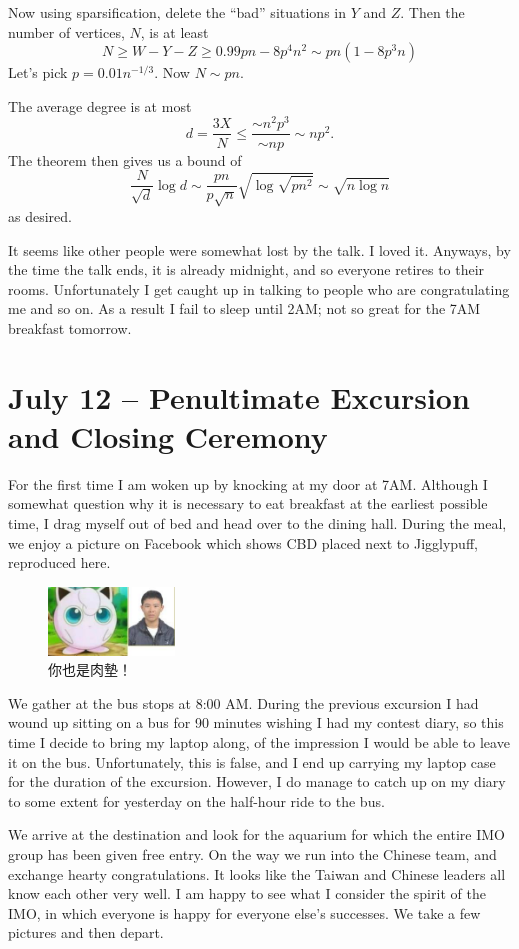 \documentclass[11pt]{scrreprt}
\numberwithin{figure}{chapter}
\begin{document}
Now using sparsification, delete the ``bad'' situations in $Y$ and $Z$.  Then the number of vertices, $N$, is at least
\[ N \ge W - Y - Z \ge 0.99 pn - 8p^4n^2 \sim pn(1-8p^3n) \]
Let's pick $p = 0.01n^{-1/3}$.  Now $N \sim pn$.

The average degree is at most \[ d = \frac{3X}{N} \le \frac{\sim n^2p^3}{\sim np} \sim np^2. \]
The theorem then gives us a bound of
\[ \frac{N}{\sqrt{d}} \log d \sim \frac{pn}{p\sqrt n} \sqrt{\log \sqrt{pn^2}} \sim \sqrt{n \log n} \]
as desired.

It seems like other people were somewhat lost by the talk.
I loved it.
Anyways, by the time the talk ends, it is already midnight, and so everyone retires to their rooms.
Unfortunately I get caught up in talking to people who are congratulating me and so on.
As a result I fail to sleep until 2AM; not so great for the 7AM breakfast tomorrow.

\section{July 12 -- Penultimate Excursion and Closing Ceremony}
For the first time I am woken up by knocking at my door at 7AM.
Although I somewhat question why it is necessary to eat breakfast at the earliest possible time, I drag myself out of bed and head over to the dining hall.
During the meal, we enjoy a picture on Facebook which shows CBD placed next to Jigglypuff, reproduced here.

\begin{figure}[ht]
  \centering
  \includegraphics[width=0.3\textwidth]{media/cbd_jigglypuff.jpg}
  \caption{你也是肉墊！}
\end{figure}

We gather at the bus stops at 8:00 AM.
During the previous excursion I had wound up sitting on a bus for 90 minutes wishing I had my contest diary, so this time I decide
to bring my laptop along, of the impression I would be able to leave it on the bus.
Unfortunately, this is false, and I end up carrying my laptop case for the duration of the excursion.
However, I do manage to catch up on my diary to some extent for yesterday on the half-hour ride to the bus.

We arrive at the destination and look for the aquarium for which the entire IMO group has been given free entry.
On the way we run into the Chinese team, and exchange hearty congratulations.
It looks like the Taiwan and Chinese leaders all know each other very well.
I am happy to see what I consider the spirit of the IMO, in which everyone is happy for everyone else's successes.
We take a few pictures and then depart.
\end{document}
